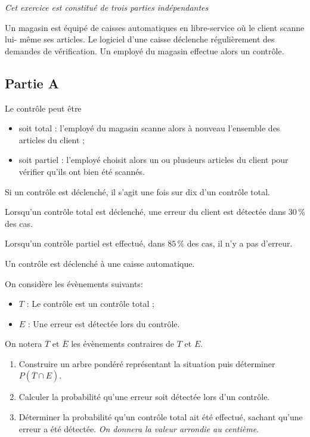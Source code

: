 \emph{Cet exercice est constitué de trois parties indépendantes}

\medskip

Un magasin est équipé de caisses automatiques en libre-service où le client scanne lui- même ses articles. Le logiciel d'une caisse déclenche régulièrement des demandes de vérification. Un employé du magasin effectue alors un contrôle.

\subsection*{Partie A}

Le contrôle peut être

\begin{itemize}[label=$\bullet~$]
\item soit \og total \fg{} : l'employé du magasin scanne alors à nouveau l'ensemble des
articles du client ;
\item soit \og partiel\fg{} : l'employé choisit alors un ou plusieurs articles du client pour vérifier
qu'ils ont bien été scannés.
\end{itemize}

Si un contrôle est déclenché, il s'agit une fois sur dix d'un contrôle total.

Lorsqu'un contrôle total est déclenché, une erreur du client est détectée dans 30\,\% des cas.

Lorsqu'un contrôle partiel est effectué, dans $85\,\%$ des cas, il n'y a pas d'erreur.

\medskip

Un contrôle est déclenché à une caisse automatique. 

On considère les évènements suivants:

\begin{itemize}[label=$\bullet~$]
\item $T$ : \og Le contrôle est un contrôle total \fg ;
\item $E$ : \og Une erreur est détectée lors du contrôle\fg.
\end{itemize}

On notera $\overline{T}$ et $\overline{E}$ les évènements contraires de $T$ et $E$.

\medskip

\begin{enumerate}
\item Construire un arbre pondéré représentant la situation puis déterminer $P\left(\overline{T} \cap E\right)$.
\item Calculer la probabilité qu'une erreur soit détectée lors d'un contrôle.
\item Déterminer la probabilité qu'un contrôle total ait été effectué, sachant qu'une erreur
a été détectée. \emph{On donnera la valeur arrondie au centième}.
\end{enumerate}

